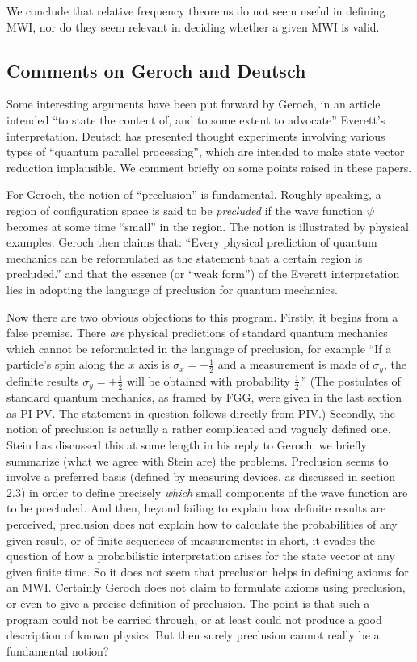 \documentclass[aps,pra,12pt]{revtex4}
\begin{document}
We conclude that relative frequency theorems do not
seem useful in 
defining MWI, nor do they seem relevant in 
deciding whether a given MWI is valid. 

\subsection{Comments on Geroch and Deutsch}

Some interesting arguments have been put forward by Geroch,\cite{ger}
in an article intended ``to state the content of, and to some extent to
advocate'' Everett's interpretation.  
Deutsch\cite{deutsch} 
has presented thought experiments involving various types of ``quantum 
parallel processing'', which are intended to make state vector reduction 
implausible.  We comment briefly on some points raised in these papers.

For Geroch, the notion of ``preclusion'' is fundamental.  Roughly speaking,
a region of configuration space is said to be {\em precluded} if the wave
function $\psi$ becomes at some time ``small'' in the region. 
The notion is illustrated by physical examples. 
Geroch then claims that: ``Every physical prediction of quantum mechanics can
be reformulated as the statement that a certain region is precluded.'' and
that the essence (or ``weak form'') of the Everett interpretation lies in
adopting the language of preclusion for quantum mechanics.

Now there are two obvious objections to this program. 
Firstly, it begins from a false premise. 
There {\em are} physical predictions of 
standard quantum mechanics which cannot be reformulated in the language
of preclusion, for example ``If a particle's spin along the $x$ axis is
$\sigma_x = +\frac{1}{2}$ and a measurement is made of $\sigma_y$, the
definite results $\sigma_y = \pm \frac{1}{2}$ will be obtained with
probability $\frac{1}{2}$.'' 
(The postulates of standard quantum mechanics, as framed by
FGG, were given in the last section as PI-PV. The statement in question
follows directly from PIV.) 
Secondly, the notion of preclusion is actually a rather complicated and 
vaguely defined one. 
Stein has discussed this at some length in his reply\cite{stein} to Geroch; 
we briefly summarize (what we agree with Stein are) the problems.
Preclusion seems to involve
a preferred basis (defined by measuring devices, as 
discussed in section 2.3) in order to define precisely {\em which}
small components of the wave function are to be precluded. 
And then, beyond failing to explain how definite results are
perceived, preclusion does not explain how to
calculate the probabilities of any given result, or of finite sequences 
of measurements: in short, it evades the question of how a probabilistic
interpretation arises for the state vector at any given finite time. 
So it does not seem that preclusion helps in defining axioms for an MWI.
Certainly Geroch does not claim to formulate axioms
using preclusion, or even to give a precise definition of preclusion.  
The point is that such a program could not be carried through, or at least 
could not produce a good description of known physics.
But then surely preclusion cannot really be a fundamental notion? 
 
\end{document}
